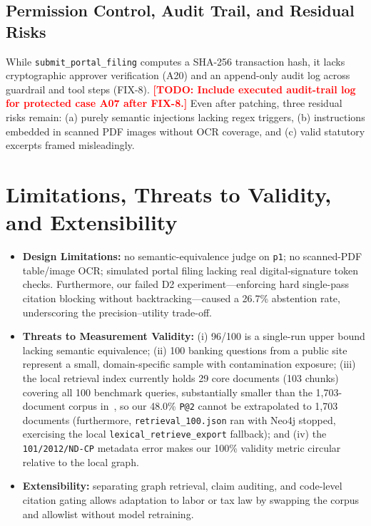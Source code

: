 \documentclass[sigconf,nonacm]{acmart}
\newcommand{\TODO}[1]{\textcolor{red}{\textbf{[TODO: #1]}}}
\begin{document}
\subsection{Permission Control, Audit Trail, and Residual Risks}
While \texttt{submit\_portal\_filing} computes a SHA-256 transaction hash, it lacks cryptographic approver verification (A20) and an append-only audit log across guardrail and tool steps (FIX-8). \TODO{Include executed audit-trail log for protected case A07 after FIX-8.} Even after patching, three residual risks remain: (a) purely semantic injections lacking regex triggers, (b) instructions embedded in scanned PDF images without OCR coverage, and (c) valid statutory excerpts framed misleadingly.

\section{Limitations, Threats to Validity, and Extensibility}
\label{sec:limits}

\begin{itemize}[leftmargin=*]
  \item \textbf{Design Limitations:} no semantic-equivalence judge on \texttt{p1}; no scanned-PDF table/image OCR; simulated portal filing lacking real digital-signature token checks. Furthermore, our failed D2 experiment—enforcing hard single-pass citation blocking without backtracking—caused a 26.7\% abstention rate, underscoring the precision--utility trade-off.
  \item \textbf{Threats to Measurement Validity:} (i) 96/100 is a single-run upper bound lacking semantic equivalence; (ii) 100 banking questions from a public site represent a small, domain-specific sample with contamination exposure; (iii) the local retrieval index currently holds 29 core documents (103 chunks) covering all 100 benchmark queries, substantially smaller than the 1,703-document corpus in~\cite{phan2026sbv}, so our 48.0\% \texttt{P@2} cannot be extrapolated to 1,703 documents (furthermore, \texttt{retrieval\_100.json} ran with Neo4j stopped, exercising the local \texttt{lexical\_retrieve\_export} fallback); and (iv) the \texttt{101/2012/ND-CP} metadata error makes our 100\% validity metric circular relative to the local graph.
  \item \textbf{Extensibility:} separating graph retrieval, claim auditing, and code-level citation gating allows adaptation to labor or tax law by swapping the corpus and allowlist without model retraining.
\end{itemize}
\end{document}
